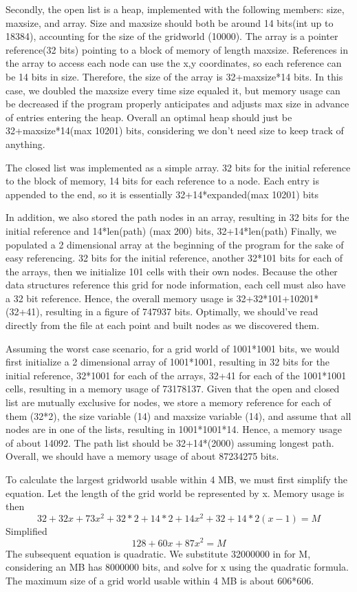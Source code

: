 \documentclass{article}
\begin{document}
Secondly, the open list is a heap, implemented with the following members: size, maxsize, and array. Size and maxsize should both be around 14 bits(int up to 18384), accounting for the size of the gridworld (10000). The array is a pointer reference(32 bits) pointing to a block of memory of length maxsize. References in the array to access each node can use the x,y coordinates, so each reference can be 14 bits in size. Therefore, the size of the array is 32+maxsize*14 bits. In this case, we doubled the maxsize every time size equaled it, but memory usage can be decreased if the program properly anticipates and adjusts max size in advance of entries entering the heap. Overall an optimal heap should just be 32+maxsize*14(max 10201) bits, considering we don't need size to keep track of anything.

The closed list was implemented as a simple array. 32 bits for the initial reference to the block of memory, 14 bits for each reference to a node. Each entry is appended to the end, so it is essentially 32+14*expanded(max 10201) bits

In addition, we also stored the path nodes in an array, resulting in 32 bits for the initial reference and 14*len(path) (max 200) bits, 32+14*len(path)
Finally, we populated a 2 dimensional array at the beginning of the program for the sake of easy referencing. 32 bits for the initial reference, another 32*101 bits for each of the arrays, then we initialize 101 cells with their own nodes. Because the other data structures reference this grid for node information, each cell must also have a 32 bit reference. Hence, the overall memory usage is 32+32*101+10201*(32+41), resulting in a figure of 747937 bits. Optimally, we should've read directly from the file at each point and built nodes as we discovered them.

Assuming the worst case scenario, for a grid world of 1001*1001 bits, we would first initialize a 2 dimensional array of 1001*1001, resulting in 32 bits for the initial reference, 32*1001 for each of the arrays, 32+41 for each of the 1001*1001 cells, resulting in a memory usage of 73178137. Given that the open and closed list are mutually exclusive for nodes, we store a memory reference for each of them (32*2), the size variable (14) and maxsize variable (14), and assume that all nodes are in one of the lists, resulting in 1001*1001*14. Hence, a memory usage of about 14092. The path list should be 32+14*(2000) assuming longest path. Overall, we should have a memory usage of about 87234275 bits.

To calculate the largest gridworld usable within 4 MB, we must first simplify the equation. Let the length of the grid world be represented by x. Memory usage is then
\begin{equation}
32+32x+73x^2+32*2+14*2+14x^2+32+14*2(x-1) = M
\end{equation}
Simplified
\begin{equation}
	128+60x+87x^2 = M
\end{equation}
The subsequent equation is quadratic. We substitute 32000000 in for M, considering an MB has 8000000 bits, and solve for x using the quadratic formula. The maximum size of a grid world usable within 4 MB is about 606*606.
\end{document}
